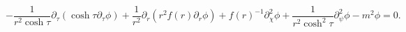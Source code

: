 \begin{equation}
-\frac{1}{r^2 \cosh \tau} \partial _\tau (\cosh \tau \partial _\tau \phi) + \frac{1}{r^2} \partial _r ( r^2 f(r) \partial _r \phi) + f(r)
^{-1} \partial_\chi ^2 \phi + \frac{1}{r^2 \cosh ^2 \tau} \partial _\psi ^2 \phi - m^2 \phi = 0 .
\end{equation}

